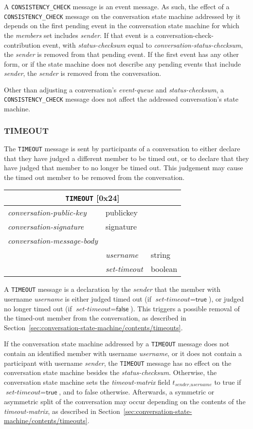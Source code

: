 \documentclass{article}
\def\npmessage#1{\texttt{#1}}
\def\field#1{\textit{#1}}
\def\smfield#1{\textsl{#1}}
\def\type#1{\textsf{#1}}
\newenvironment{conversationmessage}[2]{
\newcommand{\messagefield}[2]{
& \field{##1} & \type{##2} \\
\hline
}
\hspace{2em minus 2em}\begin{tabular}{|l|l|l|}
\hline
\multicolumn{3}{|c|}{\npmessage{#1} [#2]} \\
\hline
\hline
\field{conversation-public-key} & \multicolumn{2}{l|}{\type{publickey}} \\
\hline
\field{conversation-signature} & \multicolumn{2}{l|}{\type{signature}} \\
\hline
\field{conversation-message-body} & \multicolumn{2}{l|}{} \\
\hline
}{
\end{tabular}
}
\begin{document}
A \npmessage{CONSISTENCY\_CHECK} message is an event message.
As such, the effect of a \npmessage{CONSISTENCY\_CHECK} message on the conversation state machine addressed by it depends on the first pending event in the conversation state machine for which the \smfield{members} set includes \field{sender}.
If that event is a \type{conversation-check-contribution} event, with \smfield{status-checksum} equal to \field{conversation-status-checksum}, the \field{sender} is removed from that pending event.
If the first event has any other form, or if the state machine does not describe any pending events that include \field{sender}, the \field{sender} is removed from the conversation.

Other than adjusting a conversation's \smfield{event-queue} and \smfield{status-checksum}, a \npmessage{CONSISTENCY\_CHECK} message does not affect the addressed conversation's state machine.


\subsubsection{TIMEOUT}
\label{sec:messages/timeout}

The \npmessage{TIMEOUT} message is sent by participants of a conversation to either declare that they have judged a different member to be timed out, or to declare that they have judged that member to no longer be timed out.
This judgement may cause the timed out member to be removed from the conversation.

\begin{conversationmessage}{TIMEOUT}{0x24}
\messagefield{username}{string}
\messagefield{set-timeout}{boolean}
\end{conversationmessage}

A \npmessage{TIMEOUT} message is a declaration by the \field{sender} that the member with username \field{username} is either judged timed out (if $\field{set-timeout} = \textsf{true}$), or judged no longer timed out (if $\field{set-timeout} = \textsf{false}$).
This triggers a possible removal of the timed-out member from the conversation, as described in Section~\ref{sec:conversation-state-machine/contents/timeouts}.

If the conversation state machine addressed by a \npmessage{TIMEOUT} message does not contain an identified member with username \field{username}, or it does not contain a participant with username \field{sender}, the \npmessage{TIMEOUT} message has no effect on the conversation state machine besides the \smfield{status-checksum}.
Otherwise, the conversation state machine sets the \smfield{timeout-matrix} field $t_{\field{sender},\field{username}}$ to \textsf{true} if $\field{set-timeout} = \textsf{true}$, and to \textsf{false} otherwise.
Afterwards, a symmetric or asymmetric split of the conversation may occur depending on the contents of the \smfield{timeout-matrix}, as described in Section~\ref{sec:conversation-state-machine/contents/timeouts}.
\end{document}
